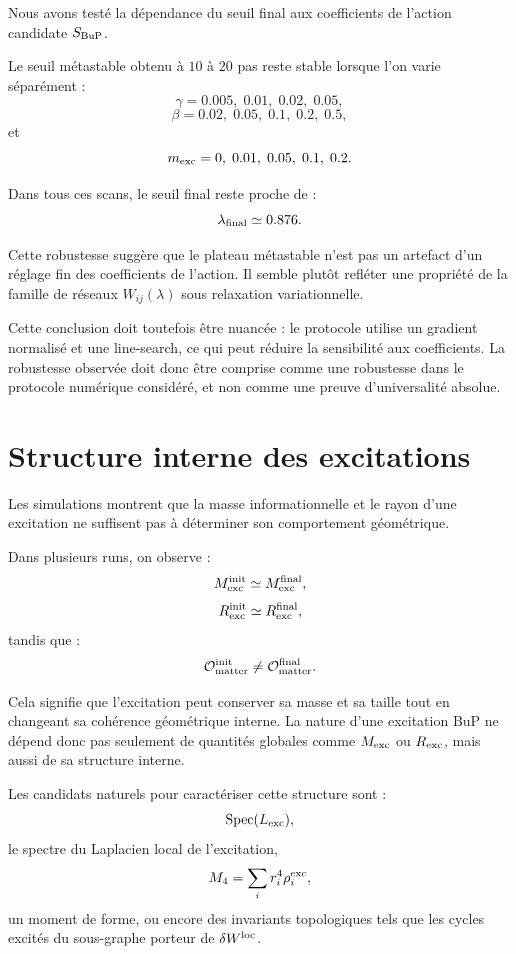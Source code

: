 \documentclass[11pt,a4paper]{article}
\begin{document}
Nous avons testé la dépendance du seuil final aux coefficients de l'action
candidate \(S_{\rm BuP}\).

Le seuil métastable obtenu à \(10\) à \(20\) pas reste stable lorsque l'on varie
séparément :
\[
\gamma=0.005,\;0.01,\;0.02,\;0.05,
\]
\[
\beta=0.02,\;0.05,\;0.1,\;0.2,\;0.5,
\]
et
\[
m_{\rm exc}=0,\;0.01,\;0.05,\;0.1,\;0.2.
\]

Dans tous ces scans, le seuil final reste proche de :
\[
\lambda_{\rm final}\simeq0.876.
\]

Cette robustesse suggère que le plateau métastable n'est pas un artefact d'un
réglage fin des coefficients de l'action. Il semble plutôt refléter une propriété
de la famille de réseaux \(W_{ij}(\lambda)\) sous relaxation variationnelle.

Cette conclusion doit toutefois être nuancée : le protocole utilise un gradient
normalisé et une line-search, ce qui peut réduire la sensibilité aux coefficients.
La robustesse observée doit donc être comprise comme une robustesse dans le
protocole numérique considéré, et non comme une preuve d'universalité absolue.

\section{Structure interne des excitations}

Les simulations montrent que la masse informationnelle et le rayon d'une
excitation ne suffisent pas à déterminer son comportement géométrique.

Dans plusieurs runs, on observe :
\[
M_{\rm exc}^{\rm init}
\simeq
M_{\rm exc}^{\rm final},
\]
\[
R_{\rm exc}^{\rm init}
\simeq
R_{\rm exc}^{\rm final},
\]
tandis que :
\[
\mathcal{O}_{\rm matter}^{\rm init}
\neq
\mathcal{O}_{\rm matter}^{\rm final}.
\]

Cela signifie que l'excitation peut conserver sa masse et sa taille tout en
changeant sa cohérence géométrique interne. La nature d'une excitation BuP ne
dépend donc pas seulement de quantités globales comme \(M_{\rm exc}\) ou
\(R_{\rm exc}\), mais aussi de sa structure interne.

Les candidats naturels pour caractériser cette structure sont :
\[
{\rm Spec}(L_{\rm exc}),
\]
le spectre du Laplacien local de l'excitation,
\[
M_4
=
\sum_i r_i^4\rho_i^{\rm exc},
\]
un moment de forme,
ou encore des invariants topologiques tels que les cycles excités du sous-graphe
porteur de \(\delta W^{\rm loc}\).
\end{document}
